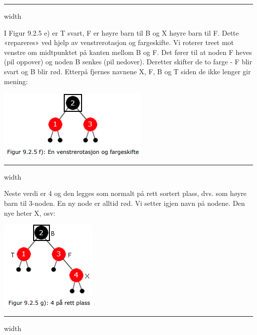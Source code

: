 \documentclass[11pt]{article}
\begin{document}
        \hrule width \textwidth

        \begin{multicols}{2}
            I Figur 9.2.5 e) er T svart, F er høyre barn til B og X høyre barn til F. Dette «repareres» ved
            hjelp av venstrerotasjon og fargeskifte. Vi roterer treet mot venstre om midtpunktet på
            kanten mellom B og F. Det fører til at noden F heves (pil oppover) og noden B senkes (pil
            nedover). Deretter skifter de to farge - F blir svart og B blir rød. Etterpå fjernes navnene X, F,
            B og T siden de ikke lenger gir mening:

            \columnbreak
            \includegraphics[center]{f-9.2.5f.png}
        \end{multicols}

        \hrule width \textwidth

        \begin{multicols}{2}
            Neste verdi er 4 og den legges som normalt på rett sortert plass, dvs. som høyre barn til
            3-noden. En ny node er alltid rød. Vi setter igjen navn på nodene. Den nye heter X, osv:

            \columnbreak
            \includegraphics[center]{f-9.2.5g.png}
        \end{multicols}

        \hrule width \textwidth
\end{document}
